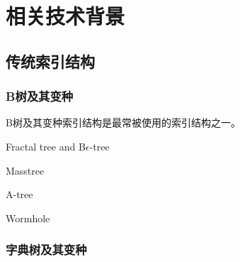 \chapter{相关技术背景}
\label{chap:back}

\section{传统索引结构}

\subsection{B树及其变种}

B树及其变种索引结构是最常被使用的索引结构之一\cite{graefe2001b}。


Fractal tree and B$\epsilon$-tree

Masstree

A-tree

Wormhole



\subsection{字典树及其变种}

